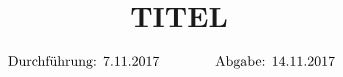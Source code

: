 

\subject{VERSUCH NUMMER}
\title{TITEL}

\date{
  \begin{align}
    \text{Durchführung: } & \text{7.11.2017} & \hspace{3em} & \text{Abgabe: 14.11.2017} \notag
  \end{align}
}




\maketitle
\thispagestyle{empty}
\tableofcontents
\newpage






\printbibliography{}


